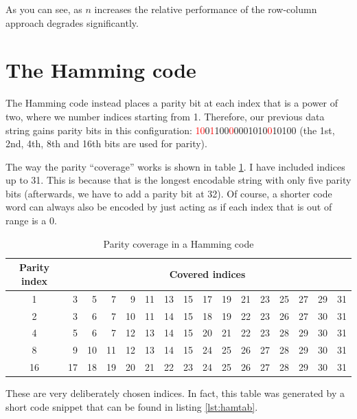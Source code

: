 \documentclass{article}
\begin{document}
    As you can see, as $n$ increases the relative performance of the row-column
    approach degrades significantly.

    \section{The Hamming code}

    The Hamming code instead places a parity bit at each index that is a power
    of two, where we number indices starting from 1. Therefore, our previous
    data string gains parity bits in this configuration:
    \textcolor{red}{10}0\textcolor{red}{1}100\textcolor{red}{0}0001010\textcolor{red}{0}10100
    (the 1st, 2nd, 4th, 8th and 16th bits are used for parity).

    The way the parity ``coverage'' works is shown in table
    \ref{tab:hamming-indices}.  I have included indices up to 31. This is
    because that is the longest encodable string with only five parity bits
    (afterwards, we have to add a parity bit at 32). Of course, a shorter code
    word can always also be encoded by just acting as if each index that is out
    of range is a 0.

\begin{table}[h]
\begin{center}
    \begin{tabular}{crrrrrrrrrrrrrrr}
    \toprule
    Parity index & \multicolumn{15}{c}{Covered indices} \\
    \midrule
    1 & 3 & 5 & 7 & 9 & 11 & 13 & 15 & 17 & 19 & 21 & 23 & 25 & 27 & 29 & 31 \\
    2 & 3 & 6 & 7 & 10 & 11 & 14 & 15 & 18 & 19 & 22 & 23 & 26 & 27 & 30 & 31 \\
    4 & 5 & 6 & 7 & 12 & 13 & 14 & 15 & 20 & 21 & 22 & 23 & 28 & 29 & 30 & 31 \\
    8 & 9 & 10 & 11 & 12 & 13 & 14 & 15 & 24 & 25 & 26 & 27 & 28 & 29 & 30 & 31 \\
    16 & 17 & 18 & 19 & 20 & 21 & 22 & 23 & 24 & 25 & 26 & 27 & 28 & 29 & 30 & 31 \\
    \bottomrule
    \end{tabular}
    \caption{Parity coverage in a Hamming code}\label{tab:hamming-indices}
\end{center}
\end{table}

    These are very deliberately chosen indices. In fact, this table was
    generated by a short code snippet that can be found in listing
    \ref{lst:hamtab}.
\end{document}
